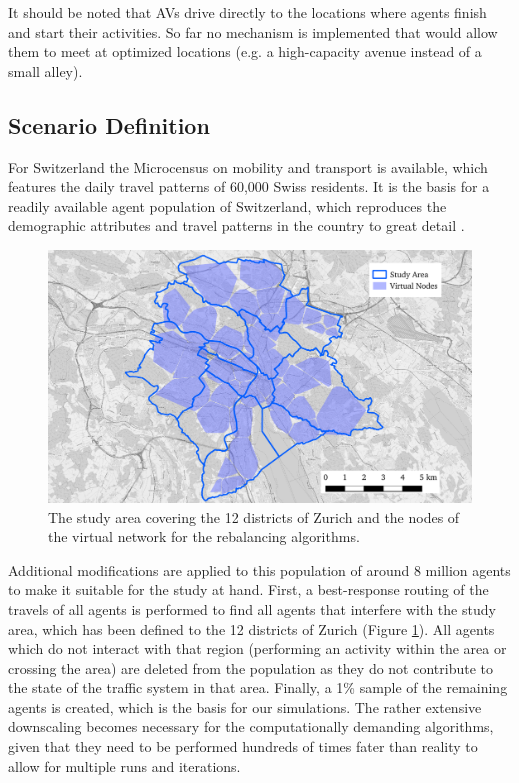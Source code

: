 It should be noted that AVs drive directly to the locations where agents finish and
start their activities. So far no mechanism is implemented that would allow them
to meet at optimized locations (e.g. a high-capacity avenue instead of a small
alley).

\subsection{Scenario Definition}

For Switzerland the Microcensus on mobility and transport \cite{microcensus} is
available, which features the daily travel patterns of 60,000 Swiss residents.
It is the basis for a readily available agent population of
Switzerland, which reproduces the demographic attributes and travel patterns
in the country to great detail \cite{ivtbaseline}.

\begin{figure}[h]
\begin{center}\includegraphics[width=1.0\textwidth]{figures/map.pdf}\end{center}
\caption{The study area covering the 12 districts of Zurich and the nodes of the virtual network for the rebalancing algorithms.}
\label{fig:study_area_vnodes}
\end{figure}

Additional modifications are applied to this population of around 8 million
agents to make it suitable for the study at hand. First, a best-response routing
of the travels of all agents is performed to find all agents that interfere
with the study area, which has been defined to the 12 districts of Zurich (Figure \ref{fig:study_area_vnodes}).
All agents which do not interact with that region (performing an activity within
the area or crossing the area) are deleted from the population as they do
not contribute to the state of the traffic system in that area. Finally, a 1\%
sample of the remaining agents is created, which is the basis for our
simulations. The rather extensive downscaling becomes necessary for the computationally
demanding algorithms, given that they need to be performed hundreds of times fater
than reality to allow for multiple runs and iterations.

